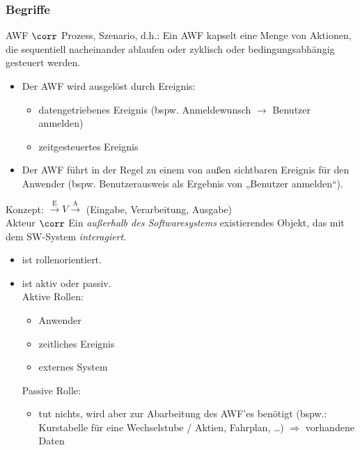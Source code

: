 \subsubsection{Begriffe}
AWF $\corr$ Prozess, Szenario, d.h.: Ein AWF kapselt eine Menge von Aktionen, die sequentiell nacheinander ablaufen oder zyklisch oder bedingungsabhängig gesteuert werden.
\begin{itemize}
\item Der AWF wird ausgelöst durch Ereignis:
\begin{itemize}[label=$\to$]
\item datengetriebenes Ereignis (bspw. Anmeldewunsch $\to$ Benutzer anmelden)
\item zeitgesteuertes Ereignis
\end{itemize}
\item Der AWF führt in der Regel zu einem von außen sichtbaren Ereignis für den Anwender (bspw. Benutzerausweis als Ergebnis von „Benutzer anmelden“).
\end{itemize}
Konzept: $\overset{\text{E}}{\longrightarrow}\boxed{V}\overset{\text{A}}{\longrightarrow}$ (Eingabe, Verarbeitung, Ausgabe) \bigskip\\
Akteur $\corr$ Ein \emph{außerhalb des Softwaresystems} existierendes Objekt, das mit dem SW-System \emph{interagiert}.
\begin{itemize}
\item ist rollenorientiert.
\item ist aktiv oder passiv.\\
Aktive Rollen:
\begin{itemize}
\item Anwender
\item zeitliches Ereignis
\item externes System
\end{itemize}
Passive Rolle:
\begin{itemize}
\item tut nichts, wird aber zur Abarbeitung des AWF'es benötigt (bspw.: Kurstabelle für eine Wechselstube / Aktien, Fahrplan, …) $\Rightarrow$ vorhandene Daten
\end{itemize}
\end{itemize}

